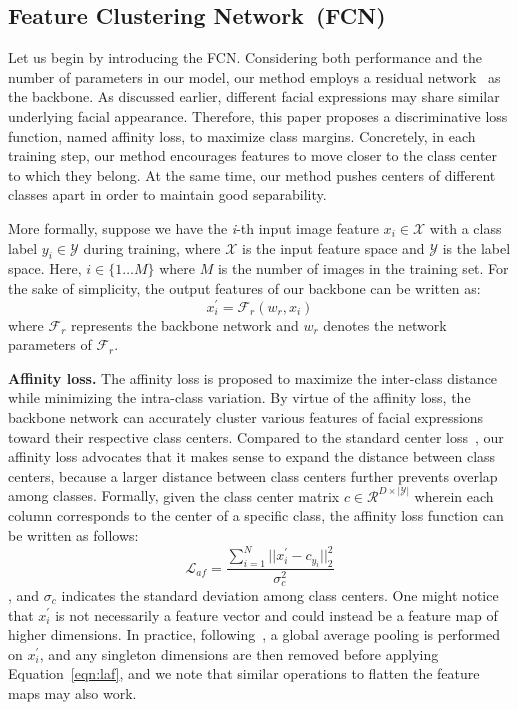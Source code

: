 \documentclass{article}
\begin{document}
\subsection{Feature Clustering Network~(FCN)}
Let us begin by introducing the FCN. Considering both performance and the number of parameters in our model, our method employs a residual network~\cite{he2016deep} as the backbone. As discussed earlier, different facial expressions may share similar underlying facial appearance. Therefore, this paper proposes a discriminative loss function, named affinity loss, to maximize class margins. Concretely, in each training step, our method encourages features to move closer to the class center to which they belong.
At the same time, our method pushes centers of different classes apart in order to maintain good separability.

More formally, {suppose we have the \textit{i}-th input image feature $x_i\in \mathcal{X}$ with a class label $y_i\in \mathcal{Y}$ during training, where $\mathcal{X}$ is the input feature space and $\mathcal{Y}$ is the label space. Here, $i \in \{ 1 \dots M\}$ where $M$ is the number of images in the training set.} For the sake of simplicity, the output features of our backbone can be written as: 
\begin{equation}
    x_i^{'} = \mathcal{F}_r(w_r,x_i)
\end{equation}
\noindent where $\mathcal{F}_r$ represents the backbone network and $w_r$ denotes the network parameters of $\mathcal{F}_r$.


\noindent\textbf{{Affinity loss.}} The affinity loss is proposed to maximize the inter-class distance while minimizing the intra-class variation. By virtue of the affinity loss,
the backbone network can accurately cluster various features of facial expressions toward their respective class centers.
Compared to the standard center loss~\cite{wen2016discriminative}, our affinity loss advocates that it makes sense to expand the distance between class centers, because a larger distance between class centers further prevents overlap among classes. Formally, {given the class center matrix $c\in \mathcal{R}^{D \times|\mathcal{Y}|}$ wherein each column corresponds to the center of a specific class}, the affinity loss function can be written as follows:
\begin{equation}
    \mathcal{L}_{af} = \frac{\sum_{i=1}^N||x_i^{'}-c_{y_i}||_2^{2}}{\sigma _c^2}
    \label{eqn:laf}
\end{equation}
, and $\sigma _c$ indicates the standard deviation among class centers. {One might notice that $x_i^{'}$ is not necessarily a feature vector and could instead be a feature map of higher dimensions. In practice, following}~\cite{wen2016discriminative}{, a global average pooling is performed on $x_i^{'}$, and any singleton dimensions are then removed before applying Equation}~\ref{eqn:laf}, and we note that similar operations to flatten the feature maps may also work.
\end{document}

